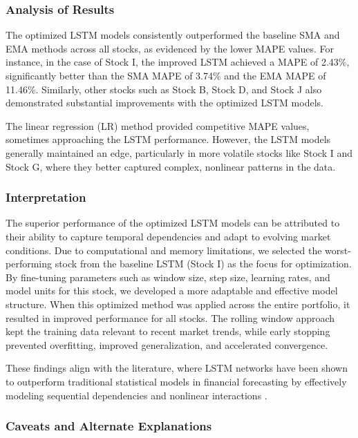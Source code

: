 \documentclass[10pt,twocolumn]{article}
\begin{document}
\subsubsection{Analysis of Results}

The optimized LSTM models consistently outperformed the baseline SMA and EMA methods across all stocks, as evidenced by the lower MAPE values. For instance, in the case of Stock I, the improved LSTM achieved a MAPE of 2.43\%, significantly better than the SMA MAPE of 3.74\% and the EMA MAPE of 11.46\%. Similarly, other stocks such as Stock B, Stock D, and Stock J also demonstrated substantial improvements with the optimized LSTM models. 

The linear regression (LR) method provided competitive MAPE values, sometimes approaching the LSTM performance. However, the LSTM models generally maintained an edge, particularly in more volatile stocks like Stock I and Stock G, where they better captured complex, nonlinear patterns in the data.

\subsubsection{Interpretation}

The superior performance of the optimized LSTM models can be attributed to their ability to capture temporal dependencies and adapt to evolving market conditions. Due to computational and memory limitations, we selected the worst-performing stock from the baseline LSTM (Stock I) as the focus for optimization. By fine-tuning parameters such as window size, step size, learning rates, and model units for this stock, we developed a more adaptable and effective model structure. When this optimized method was applied across the entire portfolio, it resulted in improved performance for all stocks. The rolling window approach kept the training data relevant to recent market trends, while early stopping prevented overfitting, improved generalization, and accelerated convergence.

These findings align with the literature, where LSTM networks have been shown to outperform traditional statistical models in financial forecasting by effectively modeling sequential dependencies and nonlinear interactions \cite{Hochreiter1997LSTM, Fischer2017LSTMFinance}.

\subsubsection{Caveats and Alternate Explanations}
\end{document}
